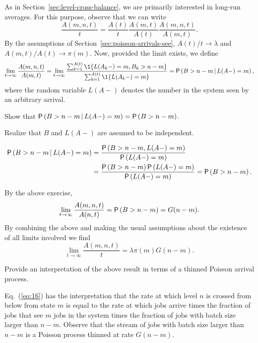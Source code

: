 As in Section~\ref{sec:level-cross-balance}, we are primarily interested in  long-run averages. For this purpose, observe that we can write
\begin{equation}\label{eq:16}
  \frac{A(m,n,t)}t =   \frac{A(t)}t \frac{A(m,t)}{A(t)}\frac{A(m,n,t)}{A(m,t)}.
\end{equation}
By the assumptions of Section~\ref{sec:poisson-arrivals-see},  $A(t)/t\to\lambda$ and $A(m,t)/A(t)\to\pi(m)$.  Now, provided the limit exists, we define
\begin{equation}\label{eq:1332}
\lim_{t\to\infty} \frac{A(m,n,t)}{A(m,t)} = 
\lim_{t\to\infty} \frac{\sum_{k=1}^{A(t)}\1{L(A_k-) = m, B_k > n-m}}
{\sum_{k=1}^{A(t)}\1{L(A_k-) = m}}=\P{B>n-m\given L(A-)=m},
\end{equation}
where the random variable $L(A-)$   denotes the number in the system seen by an arbitrary arrival.

\begin{exercise}{\faFlask}
Show that $\P{B>n-m\given L(A-)=m}=\P{B>n-m}$.
  \begin{hint}
    Realize that $B$ and $L(A-)$ are assumed to be independent.
  \end{hint}
\begin{solution}
\begin{equation*}
  \begin{split}
\P{B>n-m\given L(A-)=m} &=
\frac{\P{B>n-m,L(A-)=m}}{\P{L(A-)=m}}\\
&=\frac{\P{B>n-m}\P{L(A-)=m}}{\P{L(A-)=m}} = \P{B>n-m}.
  \end{split}
\end{equation*}
\end{solution}
\end{exercise}

By the above exercise,
\begin{equation*}
\lim_{t\to\infty} \frac{A(m,n,t)}{A(n,t)} = \P{B>n-m} = G(n-m).
\end{equation*} 
By combining the above and making the usual assumptions about the
existence of all limits involved we find
\begin{equation*}
\lim_{t\to\infty}   \frac{A(m,n,t)}t = \lambda \pi(m) G(n-m).
\end{equation*}

\begin{exercise}{\faFlask}
Provide an interpretation of the above result in terms of a thinned Poisson arrival process.
\begin{solution}
Eq.~(\ref{eq:16}) has the interpretation that the rate at which
level $n$ is crossed from below from state $m$ is equal to the rate at
which jobs arrive times the fraction of jobs that see $m$ jobs in the
system times the fraction of jobs with batch size larger than $n-m$.
Observe that the stream of jobs with batch size larger than $n-m$
is a Poisson process thinned at rate $G(n-m)$. 
\end{solution}
\end{exercise}


